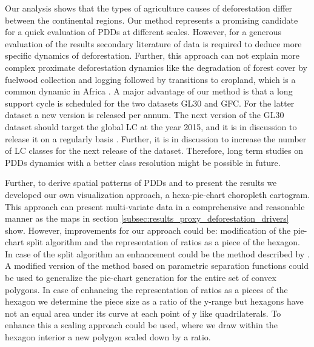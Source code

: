 		Our analysis shows that the types of agriculture causes of deforestation differ between the continental regions. Our method represents a promising candidate for a quick evaluation of \acp{PDD} at different scales. However, for a generous evaluation of the results secondary literature of data is required to deduce more specific dynamics of deforestation. Further, this approach can not explain more complex proximate deforestation dynamics like the degradation of forest cover by fuelwood collection and logging followed by transitions to cropland, which is a common dynamic in Africa \citep{Geist2001,Cabral2011}. A major advantage of our method is that a long support cycle is scheduled for the two datasets \ac{GL30} and \ac{GFC}. For the latter dataset a new version is released per annum. The next version of the \ac{GL30} dataset should target the global \ac{LC} at the year 2015, and it is in discussion to release it on a regularly basis \citep{Chen2017}. Further, it is in discussion to increase the number of \ac{LC} classes for the next release of the dataset. Therefore, long term studies on \acp{PDD} dynamics with a better class resolution might be possible in future. 

		Further, to derive spatial patterns of \acp{PDD} and to present the results we developed our own visualization approach, a hexa-pie-chart choropleth cartogram. This approach can present multi-variate data in a comprehensive and reasonable manner as the maps in section \ref{subsec:results_proxy_deforestation_drivers} show. However, improvements for our approach could be: modification of the pie-chart split algorithm and the representation of ratios as a piece of the hexagon. In case of the split algorithm an enhancement could be the method described by \citet{Skala1994}. A modified version of the method based on parametric separation functions could be used to generalize the pie-chart generation for the entire set of convex polygons. In case of enhancing the representation of ratios as a pieces of the hexagon we determine the piece size as a ratio of the y-range but hexagons have not an equal area under its curve at each point of y like quadrilaterals. To enhance this a scaling approach could be used, where we draw within the hexagon interior a new polygon scaled down by a ratio.

